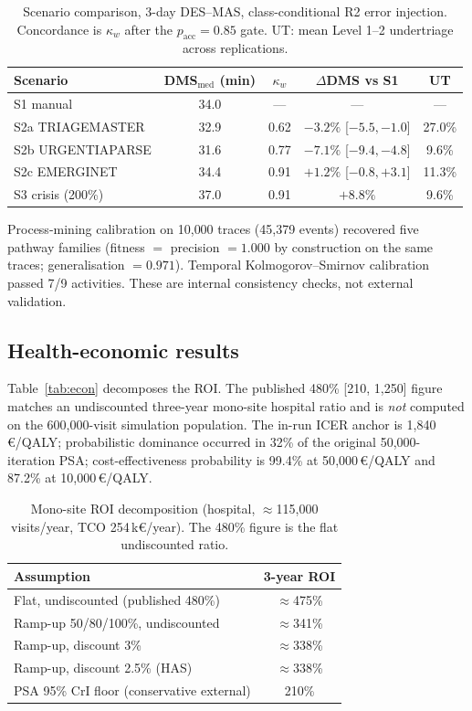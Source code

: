 \documentclass[conference]{IEEEtran}
\begin{document}
\begin{table}[!htbp]
\caption{Scenario comparison, 3-day DES--MAS, class-conditional R2 error injection. Concordance is $\kappa_w$ after the $p_{\mathrm{acc}}=0.85$ gate. UT: mean Level 1--2 undertriage across replications.}
\label{tab:sim}
\centering
\scriptsize
\setlength{\tabcolsep}{2.6pt}
\begin{tabular}{@{}lcccc@{}}
\toprule
Scenario & DMS$_{\mathrm{med}}$ (min) & $\kappa_w$ & $\Delta$DMS vs S1 & UT \\
\midrule
S1 manual & 34.0 & --- & --- & --- \\
S2a TRIAGEMASTER & 32.9 & 0.62 & $-3.2\%$ [$-5.5,-1.0$] & 27.0\% \\
S2b URGENTIAPARSE & 31.6 & 0.77 & $-7.1\%$ [$-9.4,-4.8$] & 9.6\% \\
S2c EMERGINET & 34.4 & 0.91 & $+1.2\%$ [$-0.8,+3.1$] & 11.3\% \\
S3 crisis (200\%) & 37.0 & 0.91 & $+8.8\%$ & 9.6\% \\
\bottomrule
\end{tabular}
\end{table}

Process-mining calibration on 10{,}000 traces (45{,}379 events) recovered five pathway families (fitness $=$ precision $=1.000$ by construction on the same traces; generalisation $=0.971$). Temporal Kolmogorov--Smirnov calibration passed 7/9 activities. These are internal consistency checks, not external validation.

\subsection{Health-economic results}
Table~\ref{tab:econ} decomposes the ROI. The published 480\% [210, 1{,}250] figure matches an undiscounted three-year mono-site hospital ratio and is \emph{not} computed on the 600{,}000-visit simulation population. The in-run ICER anchor is 1{,}840\,€/QALY; probabilistic dominance occurred in 32\% of the original 50{,}000-iteration PSA; cost-effectiveness probability is 99.4\% at 50{,}000\,€/QALY and 87.2\% at 10{,}000\,€/QALY. \begin{table}[!htbp]
\caption{Mono-site ROI decomposition (hospital, $\approx$115{,}000 visits/year, TCO 254\,k€/year). The 480\% figure is the flat undiscounted ratio.}
\label{tab:roi}
\centering
\scriptsize
\begin{tabular}{@{}lc@{}}
\toprule
Assumption & 3-year ROI \\
\midrule
Flat, undiscounted (published 480\%) & $\approx$475\% \\
Ramp-up 50/80/100\%, undiscounted & $\approx$341\% \\
Ramp-up, discount 3\% & $\approx$338\% \\
Ramp-up, discount 2.5\% (HAS) & $\approx$338\% \\
PSA 95\% CrI floor (conservative external) & 210\% \\
\bottomrule
\end{tabular}
\end{table}
\end{document}
